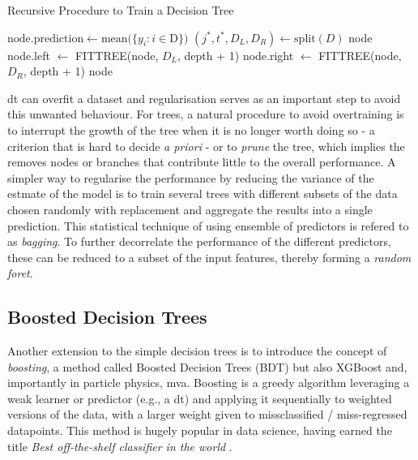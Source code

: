 \begin{algorithm}
    \caption{Recursive Procedure to Train a Decision Tree}
    \begin{algorithmic}
        \State $\text{node.prediction} \gets \text{mean}(\{y_i : i \in $D$\})$ 
        \State $(j^*, t^*, D_L, D_R) \gets \text{split}(D)$
            \State \Return node
        \Else
            \State node.left $\gets$ FITTREE(node, $D_L$, depth + 1)
            \State node.right $\gets$ FITTREE(node, $D_R$, depth + 1)
            \State \Return node
        \EndIf
    \EndFunction
    \end{algorithmic}
    \label{ag:DT}
    \end{algorithm}
\gls{dt} can overfit a dataset and regularisation serves as an important step to avoid this unwanted behaviour. For trees, a natural procedure to avoid overtraining is to interrupt the growth of the tree when it is no longer worth doing so - a criterion that is hard to decide \textit{a priori} - or to \textit{prune} the tree, which implies the removes nodes or branches that contribute little to the overall performance. A simpler way to regularise the performance by reducing the variance of the estmate of the model is to train several trees with different subsets of the data chosen randomly with replacement and aggregate the results into a single prediction. This statistical technique of using ensemble of predictors is refered to as \textit{bagging}. To further decorrelate the performance of the different predictors, these can be reduced to a subset of the input features, thereby forming a \textit{random foret}.

\subsection{Boosted Decision Trees}
Another extension to the simple decision trees is to introduce the concept of \textit{boosting}, a method called Boosted Decision Trees (BDT) but also XGBoost and, importantly in particle physics, \gls{mva}. Boosting is a greedy algorithm leveraging a weak learner or predictor (e.g., a \gls{dt}) and applying it sequentially to weighted versions of the data, with a larger weight given to missclassified / miss-regressed datapoints. This method is hugely popular in data science, having earned the title \textit{Best off-the-shelf classifier in the world} \cite{bagging_ML}. 

